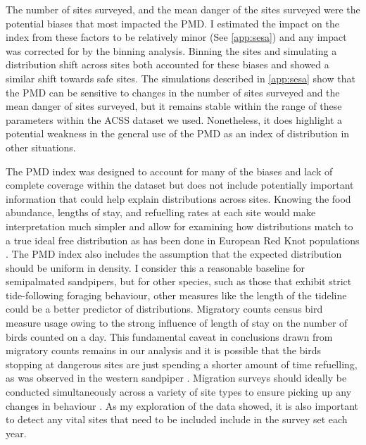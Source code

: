 The number of sites surveyed, and the mean danger of the sites surveyed were the potential biases that most impacted the PMD. I estimated the impact on the index from these factors to be relatively minor (See \autoref{app:sesa}) and any impact was corrected for by the binning analysis. Binning the sites and simulating a distribution shift across sites both accounted for these biases and showed a similar shift towards safe sites. The simulations described in \autoref{app:sesa} show that the PMD can be sensitive to changes in the number of sites surveyed and the mean danger of sites surveyed, but it remains stable within the range of these parameters within the ACSS dataset we used. Nonetheless, it does highlight a potential weakness in the general use of the PMD as an index of distribution in other situations.

The PMD index was designed to account for many of the biases and lack of complete coverage within the dataset but does not include potentially important information that could help explain distributions across sites. Knowing the food abundance, lengths of stay, and refuelling rates at each site would make interpretation much simpler and allow for examining how distributions match to a true ideal free distribution as has been done in European Red Knot populations \citep{Gils2006}. The PMD index also includes the assumption that the expected distribution should be uniform in density. I consider this a reasonable baseline for semipalmated sandpipers, but for other species, such as those that exhibit strict tide-following foraging behaviour, other measures like the length of the tideline could be a better predictor of distributions. Migratory counts census bird measure usage owing to the strong influence of length of stay on the number of birds counted on a day. This fundamental caveat in conclusions drawn from migratory counts remains in our analysis and it is possible that the birds stopping at dangerous sites are just spending a shorter amount of time refuelling, as was observed in the western sandpiper \citep{ydenberg_western_2004}. Migration surveys should ideally be conducted simultaneously across a variety of site types to ensure picking up any changes in behaviour \citep{Crewe2015b}. As my exploration of the data showed, it is also important to detect any vital sites that need to be included include in the survey set each year. 

